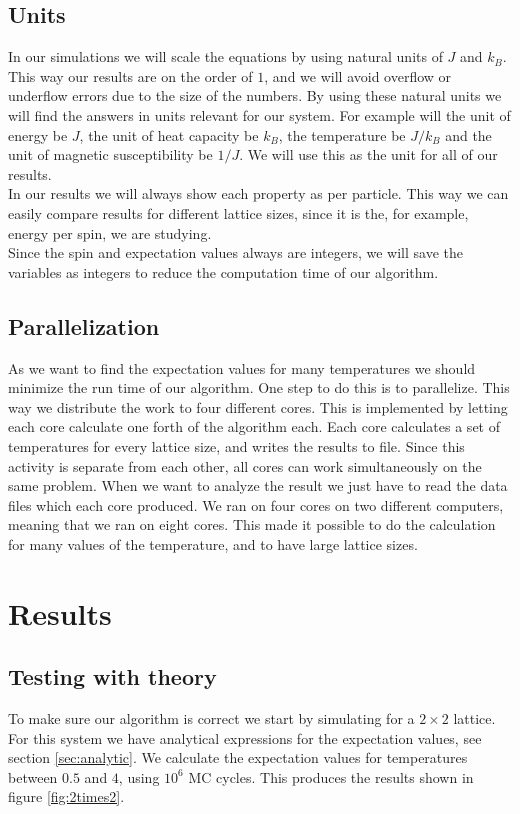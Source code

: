 \documentclass[%
 reprint,
nofootinbib,
aps,
]{revtex4-1}
\begin{document}
\subsection{Units}
In our simulations we will scale the equations by using natural units of $J$ and $k_B$. This way our results are on the order of $1$, and we will avoid overflow or underflow errors due to the size of the numbers. By using these natural units we will find the answers in units relevant for our system. For example will the unit of energy be $J$, the unit of heat capacity be $k_B$, the temperature be $J/k_B$ and the unit of magnetic susceptibility be $1/J$. We will use this as the unit for all of our results. \\
In our results we will always show each property as per particle. This way we can easily compare results for different lattice sizes, since it is the, for example, energy per spin, we are studying.\\Since the spin and expectation values always are integers, we will save the variables as integers to reduce the computation time of our algorithm.

\subsection{Parallelization}
As we want to find the expectation values for many temperatures we should minimize the run time of our algorithm. One step to do this is to parallelize. This way we distribute the work to four different cores. This is implemented by letting each core calculate one forth of the algorithm each. Each core calculates a set of temperatures for every lattice size, and writes the results to file. Since this activity is separate from each other, all cores can work simultaneously on the same problem. When we want to analyze the result we just have to read the data files which each core produced. We ran on four cores on two different computers, meaning that we ran on eight cores. This made it possible to do the calculation for many values of the temperature, and to have large lattice sizes.

\section{Results}

\subsection{Testing with theory}
To make sure our algorithm is correct we start by simulating for a $2\times 2$ lattice. For this system we have analytical expressions for the expectation values, see section \vref{sec:analytic}. We calculate the expectation values for temperatures between $0.5$ and $4$, using $10^{6}$ MC cycles. This produces the results shown in figure \vref{fig:2times2}.
\end{document}
